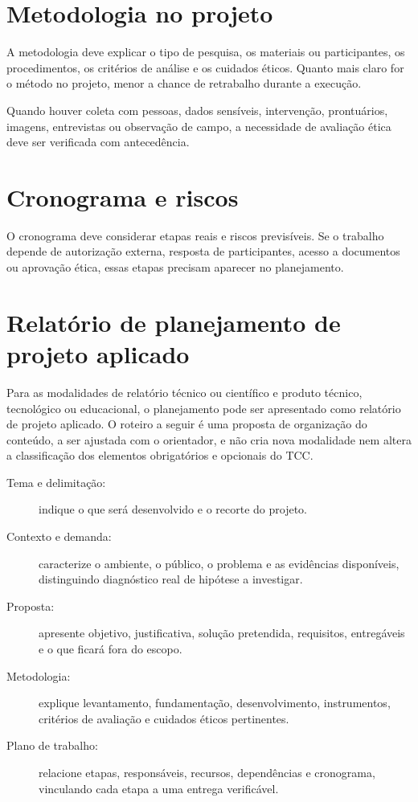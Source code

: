 \section{Metodologia no projeto}

A metodologia deve explicar o tipo de pesquisa, os materiais ou participantes, os procedimentos, os critérios de análise e os cuidados éticos. Quanto mais claro for o método no projeto, menor a chance de retrabalho durante a execução.

Quando houver coleta com pessoas, dados sensíveis, intervenção, prontuários, imagens, entrevistas ou observação de campo, a necessidade de avaliação ética deve ser verificada com antecedência.

\section{Cronograma e riscos}

O cronograma deve considerar etapas reais e riscos previsíveis. Se o trabalho depende de autorização externa, resposta de participantes, acesso a documentos ou aprovação ética, essas etapas precisam aparecer no planejamento.


\section{Relatório de planejamento de projeto aplicado}

Para as modalidades de relatório técnico ou científico e produto técnico, tecnológico ou educacional, o planejamento pode ser apresentado como relatório de projeto aplicado. O roteiro a seguir é uma proposta de organização do conteúdo, a ser ajustada com o orientador, e não cria nova modalidade nem altera a classificação dos elementos obrigatórios e opcionais do TCC.

\begin{description}
  \item[Tema e delimitação:] indique o que será desenvolvido e o recorte do projeto.
  \item[Contexto e demanda:] caracterize o ambiente, o público, o problema e as evidências disponíveis, distinguindo diagnóstico real de hipótese a investigar.
  \item[Proposta:] apresente objetivo, justificativa, solução pretendida, requisitos, entregáveis e o que ficará fora do escopo.
  \item[Metodologia:] explique levantamento, fundamentação, desenvolvimento, instrumentos, critérios de avaliação e cuidados éticos pertinentes.
  \item[Plano de trabalho:] relacione etapas, responsáveis, recursos, dependências e cronograma, vinculando cada etapa a uma entrega verificável.
\end{description}


